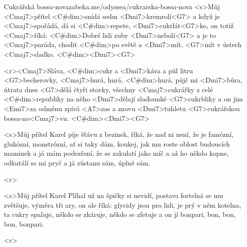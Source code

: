 \begin{song}{26}{Cukrářská bossa-nova}{zabeka.me/odyssea/cukrarska-bossa-nova}
<s>Můj <Cmaj7>přítel <C#dim>snídá sedm <Dmi7>kremrolí<G7>
a když je <Cmaj7>spořádá, dá si <C#dim>repete,
<Dmi7>cukrlát<G7>ko,
on totiž <Cmaj7>říká: <C#dim>Dobré lidi zuby <Dmi7>nebolí<G7>
a je to <Cmaj7>paráda, chodit <C#dim>po světě
a <Dmi7>mít, <G7>mít v ústech <Cmaj7>sladko. <C#dim><Dmi7><G7>

<r><Cmaj7>Sláva, <C#dim>cukr a <Dmi7>káva a půl litru <G7>becherovky,
<Cmaj7>hurá, hurá, <C#dim>hurá, půjč mi <Dmi7>bůra, útrata dnes <G7>dělá čtyři stovky,
všechny <Cmaj7>cukrářky z celé <C#dim>republiky
na něho <Dmi7>dělají slaďounké <G7>cukrbliky
a on jim <Emi7>za odměnu zpívá <A7>zas a znovu
<Dmi7>tuhletu <G7>cukrářskou bossa-no<Cmaj7>vu. <C#dim><Dmi7><G7>

<s>Můj přítel Karel pije šťávu z bezinek,
říká, že nad ni není,
že je famózní, glukózní, monstrózní, ať si taky dám,
koukej, jak mu roste oblost budoucích maminek
a já mám podezření,
že se zakulatí jako míč
a až ho někdo kopne, odkutálí se mi pryč
a já zůstanu sám, úplně sám.

<r>

<s>Můj přítel Karel Plíhal už na špičky si nevidí,
postava fortelná se mu zvětšuje,
výměra tři ary,
on ale říká: glycidy jsou pro lidi,
je prý v něm kotelna, ta cukry spaluje,
někdo se zkáruje, někdo se zfetuje
a on jí bonpari, bon, bon, bon, bonpari.

<r>
\end{song}
